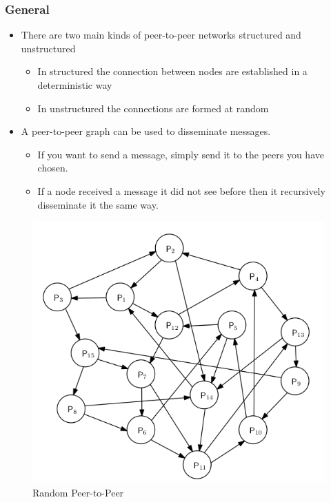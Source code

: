 \documentclass[11pt]{article}
\begin{document}
\subsubsection{General}
\label{sec:org4607e58}
\begin{itemize}
\item There are two main kinds of peer-to-peer networks structured and unstructured
\begin{itemize}
\item In structured the connection between nodes are established in a deterministic way
\item In unstructured the connections are formed at random
\end{itemize}

\item A peer-to-peer graph can be used to disseminate messages.
\begin{itemize}
\item If you want to send a message, simply send it to the peers you have chosen.
\item If a node received a message it did not see before then it recursively disseminate it the same way.
\end{itemize}
\end{itemize}

\begin{figure}[htbp]
\centering
\includegraphics[width=.9\linewidth]{Communication (Chapter 2)/screenshot_2018-08-27_17-18-53.png}
\caption{\label{fig:org90ee680}
Random Peer-to-Peer}
\end{figure}
\end{document}
